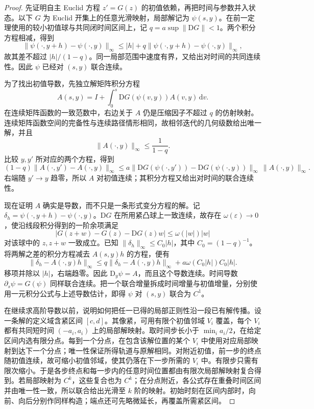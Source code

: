 \begin{proof}
	先证明自主 Euclid 方程 \(z'=G(z)\) 的初值依赖，再把时间与参数并入状态。以下 \(G\) 为 Euclid 开集上的任意光滑映射，局部解记为 \(\psi(s,y)\)。在前一定理使用的较小初值球与共同闭时间区间上，记 \(q=a\sup\|\mathrm{D}G\|<1\)。两个积分方程相减，得到
	\[
		\|\psi(\cdot,y+h)-\psi(\cdot,y)\|_\infty
		\leq |h|+q\|\psi(\cdot,y+h)-\psi(\cdot,y)\|_\infty,
	\]
	故其差不超过 \(|h|/(1-q)\)。同一局部范围中速度有界，又给出对时间的共同连续性。因此 \(\psi\) 已经对 \((s,y)\) 联合连续。

	为了找出初值导数，先独立解矩阵积分方程
	\[
		A(s,y)=I+\int_0^s \mathrm{D}G(\psi(v,y))A(v,y)\,\mathrm{d}v.
	\]
	在连续矩阵函数的一致范数中，右边关于 \(A\) 仍是压缩因子不超过 \(q\) 的仿射映射。连续矩阵函数空间的完备性与连续路径情形相同，故相邻迭代的几何级数给出唯一解，并且
	\[
		\|A(\cdot,y)\|_\infty\leq\frac1{1-q}.
	\]
	比较 \(y,y'\) 所对应的两个方程，得到
	\[
		(1-q)\|A(\cdot,y')-A(\cdot,y)\|_\infty
		\leq a\|\mathrm{D}G(\psi(\cdot,y'))-\mathrm{D}G(\psi(\cdot,y))\|_\infty\,
		\|A(\cdot,y)\|_\infty.
	\]
	右端随 \(y'\to y\) 趋零，所以 \(A\) 对初值连续；其积分方程又给出对时间的联合连续性。

	现在证明 \(A\) 确实是导数，而不只是一条形式变分方程的解。记 \(\delta_h=\psi(\cdot,y+h)-\psi(\cdot,y)\)。\(\mathrm{D}G\) 在所用紧凸球上一致连续，故存在 \(\omega(\varepsilon)\to0\)，使沿线段积分得到的一阶余项满足
	\[
		|G(z+w)-G(z)-\mathrm{D}G(z)w|\leq\omega(|w|)|w|
	\]
	对该球中的 \(z,z+w\) 一致成立。已知 \(\|\delta_h\|_\infty\leq C_0|h|\)，其中 \(C_0=(1-q)^{-1}\)。将两解之差的积分方程减去 \(A(s,y)h\) 的方程，便有
	\[
		\|\delta_h-A(\cdot,y)h\|_\infty
		\leq q\|\delta_h-A(\cdot,y)h\|_\infty
		+a\omega(C_0|h|)C_0|h|.
	\]
	移项并除以 \(|h|\)，右端趋零。因此 \(\mathrm{D}_y\psi=A\)，而且这个导数连续。时间导数 \(\partial_s\psi=G(\psi)\) 同样联合连续。把一个联合增量拆成时间增量与初值增量，分别使用一元积分公式与上述导数估计，即得 \(\psi\) 对 \((s,y)\) 联合为 \(C^1\)。

	在继续求高阶导数以前，说明如何把任一已得的局部正则性沿一段已有解传播。设一条解的定义域含紧区间 \([c,d]\)。其像紧，可用有限个初值邻域 \(V_i\) 覆盖，每个 \(V_i\) 都有共同短时间 \((-a_i,a_i)\) 上的局部解映射。取时间步长小于 \(\min_i a_i/2\)，在给定区间内选有限分点。每到一个分点，在包含该解位置的某个 \(V_i\) 中使用对应局部映射到达下一个分点；唯一性保证所得轨道与原解相同。对附近初值，前一步的终点随初值连续，故可缩小初值邻域，使其仍落在下一步所需的 \(V_i\) 中。有限步只需有限次缩小。于是各步终点和每一步内的任意时间位置都由有限次局部解映射复合得到。若局部映射为 \(C^k\)，这些复合也为 \(C^k\)；在分点附近，各公式存在重叠时间区间并由唯一性一致，所以联合给出光滑至 \(k\) 阶的映射。初始时刻在区间内部时，向前、向后分别作同样构造；端点还可先略微延长，再覆盖所需紧区间。


\end{proof}
